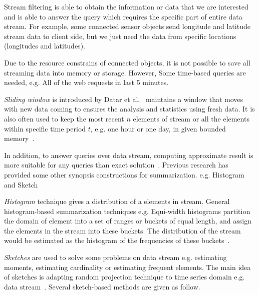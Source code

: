 Stream filtering is able to obtain the information or data that we are
interested and is able to answer the query which requires the specific part of
entire data stream. For example, some connected sensor objects send longitude
and latitude stream data to client side, but we just need the data from specific
locations (longitudes and latitudes).


Due to the resource constrains of connected objects, it is not possible to save
all streaming data into memory or storage. However, Some time-based queries are
needed, e.g. All of the web requests in last 5 minutes.

\emph{Sliding window} is introduced by Datar et
al.~\cite{datar2002maintaining} maintains a window that moves with new data
coming to ensures the analysis and statistics using fresh data. It is also often
used to keep the most recent $n$ elements of stream or all the elements within
specific time period $t$, e.g. one hour or one day, in given bounded
memory~\cite{leskovec2014mining}.


In addition, to answer queries over data stream, computing approximate result is
more suitable for any queries than exact solution~\cite{kejariwal2015real}.
Previous research has provided some other synopsis constructions for
summarization. e.g. Histogram~\cite{hesabi2015data, poosala1999approximate} and
Sketch~\cite{flajolet1985probabilistic, alon1999space,
cormode2005improved,shan2016lru}

\emph{Histogram} technique gives a distribution of a elements in stream. General
histogram-based summarization techniques e.g. Equi-width histograms partition
the domain of element into a set of ranges or buckets of equal length, and
assign the elements in the stream into these buckets. The distribution of the
stream would be estimated as the histogram of the frequencies of these
buckets~\cite{kejariwal2015real, ahmed2019data}.

\emph{Sketches} are used to solve some problems on data stream e.g. estimating
moments, estimating cardinality or estimating frequent elements. The main idea
of sketches is adapting random projection technique to time series domain e.g.
data stream~\cite{ahmed2019data}. Several sketch-based methods are given as
follow.

